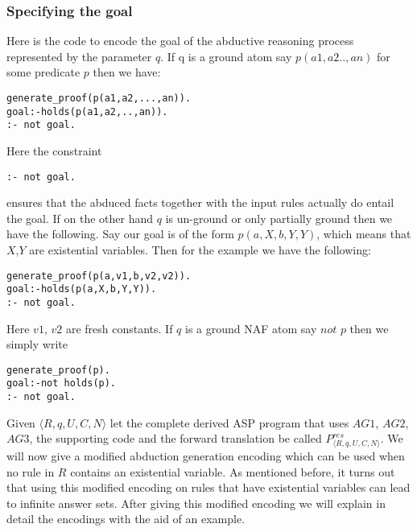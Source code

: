 \subsubsection{Specifying the goal}
Here is the code to encode the goal of the abductive reasoning process represented by the parameter $q$. If q is a ground atom say $p(a1,a2..,an)$ for some predicate $p$ then we
have:
\begin{lstlisting}[frame=none]
generate_proof(p(a1,a2,...,an)).
goal:-holds(p(a1,a2,..,an)).
:- not goal.
\end{lstlisting} 
Here the constraint \begin{lstlisting}[frame=none]
:- not goal. \end{lstlisting}
ensures that the abduced facts together with the input rules actually do entail the goal.
If on the other hand $q$ is un-ground or only partially ground then we have the following. Say our goal is of the form $p(a,X,b,Y,Y)$, which means that $X$,$Y$ are existential variables. Then for the example we have the following:
\begin{lstlisting}[frame=none]
generate_proof(p(a,v1,b,v2,v2)).
goal:-holds(p(a,X,b,Y,Y)).
:- not goal.
\end{lstlisting}
Here $v1$, $v2$ are fresh constants. If $q$ is a ground NAF atom say $\textit{not p}$ then we simply write 
\begin{lstlisting}[frame=none]
generate_proof(p).
goal:-not holds(p).
:- not goal.
\end{lstlisting}
Given $\langle R,q,U,C,N \rangle$ let the complete derived ASP program that uses $AG1$, $AG2$, $AG3$, the supporting code and the forward translation be called $P^{res}_{\langle R,q,U,C,N\rangle}$. We will now give a modified abduction generation encoding which can be used when no rule in $R$ contains an existential variable. As mentioned before, it turns out that using this modified encoding on rules that have existential variables can lead to infinite answer sets. After giving this modified encoding we will explain in detail the encodings with the aid of an example. 
